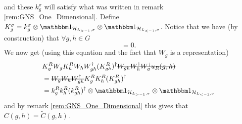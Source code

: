 \documentclass[12pt,a4paper,twoside]{article}
\numberwithin{equation}{section}
\begin{document}
and these $k^\sigma_g$ will satisfy what was written in remark \ref{rem:GNS_One_Dimensional}. Define $K^\sigma_g=k^\sigma_g\otimes\id_{\HH_{L_{>-1},\sigma}}\otimes\id_{\HH_{L_{<-1},\sigma}}$. Notice that we have (by construction) that $\forall g,h\in G$
\begin{equation}
	[K^\sigma_g\otimes\id_{\HH_{\ZZ^2/\sigma}},W_h]=0.
\end{equation}
We now get (using this equation and the fact that $W_g$ is a representation)
\begin{align}
	&K_g^R W_g K_h^R W_h W_{gh}^\dagger (K_{gh}^R)^\dagger \stkout{W_{gh}W_h^\dagger W_g^\dagger u_R(g,h)}\\
	&=\stkout{W_g W_h W_{gh}^\dagger} K_g^R K_h^R (K_{gh}^R)^\dagger\\
	&=k_g^R k_h^R (k_{gh}^R)^\dagger\otimes \id_{\HH_{L_{>-1},\sigma}}\otimes\id_{\HH_{L_{<-1},\sigma}}
\end{align}
and by remark \ref{rem:GNS_One_Dimensional} this gives that $C(g,h)=\tilde{C}(g,h)$.
\end{document}
